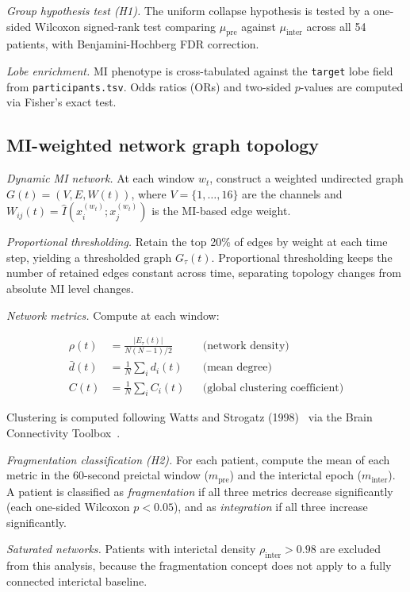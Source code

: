 \documentclass[a4paper,fleqn]{cas-dc}
\begin{document}
\textit{Group hypothesis test (H1).}
The uniform collapse hypothesis is tested by a one-sided Wilcoxon
signed-rank test comparing $\mu_{\text{pre}}$ against
$\mu_{\text{inter}}$ across all 54 patients, with Benjamini-Hochberg
FDR correction.

\textit{Lobe enrichment.}
MI phenotype is cross-tabulated against the \texttt{target} lobe field
from \texttt{participants.tsv}.
%
Odds ratios (ORs) and two-sided $p$-values are computed via Fisher's
exact test.

\subsection{MI-weighted network graph topology}
\label{sec:graphtopo}

\textit{Dynamic MI network.}
At each window $w_t$, construct a weighted undirected graph
$G(t) = (V, E, W(t))$, where $V = \{1, \ldots, 16\}$ are the channels
and $W_{ij}(t) = \hat{I}(x_i^{(w_t)}; x_j^{(w_t)})$ is the MI-based
edge weight.

\textit{Proportional thresholding.}
Retain the top 20\% of edges by weight at each time step, yielding a
thresholded graph $G_\tau(t)$.
%
Proportional thresholding keeps the number of retained edges constant
across time, separating topology changes from absolute MI level changes.

\textit{Network metrics.}
Compute at each window:

\begin{align}
  \rho(t) &= \frac{|E_\tau(t)|}{N(N-1)/2}
            &&\text{(network density)} \\[4pt]
  \bar{d}(t) &= \frac{1}{N} \sum_i d_i(t)
             &&\text{(mean degree)} \\[4pt]
  C(t) &= \frac{1}{N} \sum_i C_i(t)
        &&\text{(global clustering coefficient)}
\end{align}

Clustering is computed following Watts and Strogatz
(1998)~\citep{watts1998} via the Brain Connectivity
Toolbox~\citep{rubinov2010}.

\textit{Fragmentation classification (H2).}
For each patient, compute the mean of each metric in the 60-second
preictal window ($m_{\text{pre}}$) and the interictal epoch
($m_{\text{inter}}$).
%
A patient is classified as \textit{fragmentation} if all three metrics
decrease significantly (each one-sided Wilcoxon $p < 0.05$), and as
\textit{integration} if all three increase significantly.

\textit{Saturated networks.}
Patients with interictal density $\rho_{\text{inter}} > 0.98$ are
excluded from this analysis, because the fragmentation concept does not
apply to a fully connected interictal baseline.
\end{document}
